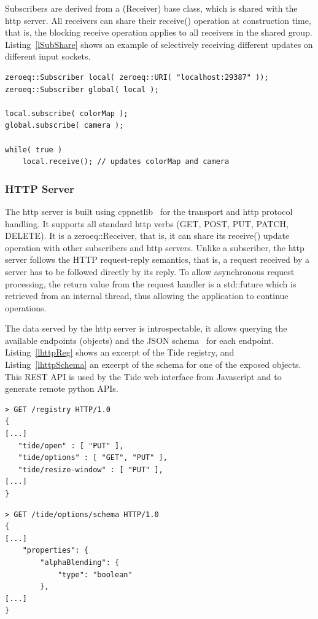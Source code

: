 \documentclass[10pt]{llncs}
\newcommand{\lref}[1]{Listing~\ref{#1}}
\begin{document}
Subscribers are derived from a \textsf(Receiver) base class, which is shared
with the http server. All receivers can share their \textsf{receive()}
operation at construction time, that is, the blocking receive operation applies
to all receivers in the shared group. \lref{lSubShare} shows an example of
selectively receiving different updates on different input sockets.

\begin{lstlisting}[float,caption=Subscriber Sharing, label=lSubShare]
zeroeq::Subscriber local( zeroeq::URI( "localhost:29387" ));
zeroeq::Subscriber global( local );

local.subscribe( colorMap );
global.subscribe( camera );

while( true )
    local.receive(); // updates colorMap and camera
\end{lstlisting}

\subsubsection{HTTP Server}

The http server is built using cppnetlib~\cite{cppnetlib} for the transport and
http protocol handling. It supports all standard http verbs (GET, POST, PUT,
PATCH, DELETE). It is a \textsf{zeroeq::Receiver}, that is, it can share its
\textsf{receive()} update operation with other subscribers and http servers.
Unlike a subscriber, the http server follows the HTTP request-reply semantics,
that is, a request received by a server has to be followed directly by its
reply. To allow asynchronous request processing, the return value from the
request handler is a \textsf{std::future} which is retrieved from an internal
thread, thus allowing the application to continue operations.

The data served by the http server is introspectable, it allows querying the
available endpoints (objects) and the JSON schema~\cite{jsonschema} for each
endpoint. \lref{lhttpReg} shows an excerpt of the Tide registry, and
\lref{lhttpSchema} an excerpt of the schema for one of the exposed objects. This
REST API is used by the Tide web interface from Javascript and to generate
remote python APIs.

\noindent\begin{minipage}[b][][b]{.48\textwidth}
\begin{lstlisting}[caption=HTTP Server Registry, label=lhttpReg]
> GET /registry HTTP/1.0
{
[...]
   "tide/open" : [ "PUT" ],
   "tide/options" : [ "GET", "PUT" ],
   "tide/resize-window" : [ "PUT" ],
[...]
}
\end{lstlisting}
\end{minipage}\hfill
\begin{minipage}[b][][b]{.48\textwidth}
\begin{lstlisting}[caption=Object JSON Schema, label=lhttpSchema]
> GET /tide/options/schema HTTP/1.0
{
[...]
    "properties": {
        "alphaBlending": {
            "type": "boolean"
        },
[...]
}
\end{lstlisting}
\end{minipage}
\end{document}
